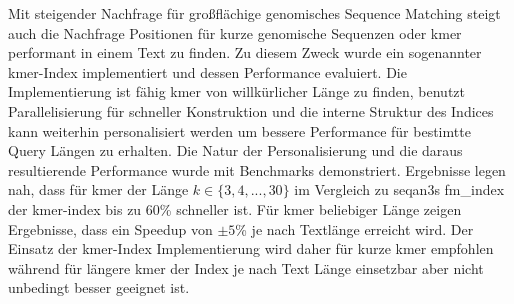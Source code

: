 \begin{abstractDE}
Mit steigender Nachfrage f\"ur gro\ss fl\"achige genomisches Sequence Matching steigt
auch die Nachfrage Positionen f\"ur kurze genomische Sequenzen oder kmer performant
in einem Text zu finden. Zu diesem Zweck wurde ein sogenannter kmer-Index implementiert
und dessen Performance evaluiert. Die Implementierung ist f\"ahig kmer von willk\"urlicher
L\"ange zu finden, benutzt Parallelisierung f\"ur schneller Konstruktion und die interne
Struktur des Indices kann weiterhin personalisiert werden um bessere Performance
f\"ur bestimtte Query L\"angen zu erhalten. Die Natur der Personalisierung und die daraus 
resultierende Performance wurde mit Benchmarks demonstriert. Ergebnisse legen nah, 
dass f\"ur kmer der L\"ange $k\in\{3,4,...,30\}$ im Vergleich zu seqan3s fm\_index der 
kmer-index bis zu 60\% schneller ist. F\"ur kmer beliebiger L\"ange zeigen Ergebnisse, 
dass ein Speedup von $\pm5$\% je nach Textl\"ange erreicht wird. Der Einsatz der kmer-Index
Implementierung wird daher f\"ur kurze kmer empfohlen w\"ahrend f\"ur l\"angere kmer der Index 
je nach Text L\"ange einsetzbar aber nicht unbedingt besser geeignet ist.
\end{abstractDE}
\vfill

\tableofcontents{}
\setcounter{page}{1}









\newpage{}


\pagebreak{}




